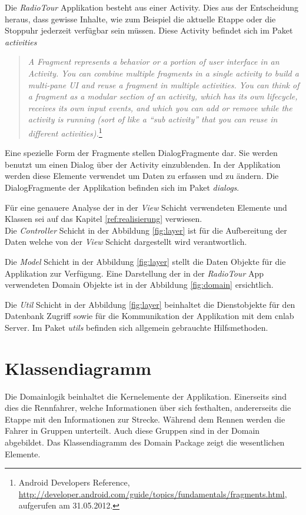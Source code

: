 Die \textit{RadioTour} Applikation besteht aus einer Activity. Dies aus der Entscheidung heraus, dass gewisse Inhalte, wie zum Beispiel die aktuelle Etappe oder die Stoppuhr jederzeit verfügbar sein müssen. Diese Activity befindet sich im Paket \textit{activities}

\begin{quote}
\textit{A Fragment represents a behavior or a portion of user interface in an Activity. You can combine multiple fragments in a single activity to build a multi-pane UI and reuse a fragment in multiple activities. You can think of a fragment as a modular section of an activity, which has its own lifecycle, receives its own input events, and which you can add or remove while the activity is running (sort of like a "`sub activity"' that you can reuse in different activities).}\footnote{Android Developers Reference, \url{http://developer.android.com/guide/topics/fundamentals/fragments.html}, aufgerufen am 31.05.2012.}
\end{quote}

Eine spezielle Form der Fragmente stellen DialogFragmente dar. Sie werden benutzt um einen Dialog über der Activity einzublenden. In der Applikation werden diese Elemente verwendet um Daten zu erfassen und zu ändern. Die DialogFragmente der Applikation befinden sich im Paket \textit{dialogs}.

Für eine genauere Analyse der in der \textit{View} Schicht verwendeten Elemente und Klassen sei auf das Kapitel \ref{ref:realisierung} verwiesen.
\\
Die \textit{Controller} Schicht in der Abbildung \ref{fig:layer} ist für die Aufbereitung der Daten welche von der \textit{View} Schicht dargestellt wird verantwortlich.

Die \textit{Model} Schicht in der Abbildung \ref{fig:layer} stellt die Daten Objekte für die Applikation zur Verfügung. Eine Darstellung der in der \textit{RadioTour} App  verwendeten Domain Objekte ist in der Abbildung \ref{fig:domain} ersichtlich.

Die \textit{Util} Schicht in der Abbildung \ref{fig:layer} beinhaltet die Dienstobjekte für den Datenbank Zugriff sowie für die Kommunikation der Applikation mit dem cnlab Server. Im Paket \textit{utils} befinden sich allgemein gebrauchte Hilfsmethoden.


\section{Klassendiagramm}
Die Domainlogik beinhaltet die Kernelemente der Applikation. Einerseits sind dies die Rennfahrer, welche Informationen über sich festhalten, andererseits die Etappe mit den Informationen zur Strecke. Während dem Rennen werden die Fahrer in Gruppen unterteilt. Auch diese Gruppen sind in der Domain abgebildet. Das Klassendiagramm des Domain Package zeigt die wesentlichen Elemente.

